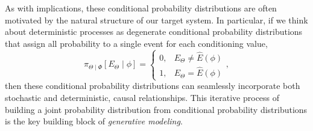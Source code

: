 As with implications, these conditional probability distributions are often 
motivated by the natural structure of our target system.  In particular, if we 
think about deterministic processes as degenerate conditional probability 
distributions that assign all probability to a single event for each conditioning 
value,
%
\begin{equation*}
\pi_{\Theta \mid \Phi} \! \left[ E_{\Theta} \mid \phi \right]
= 
\left\{
\begin{array}{rr}
0, & E_{\Theta} \ne \hat{E} \! \left( \phi \right) \\
1, & E_{\Theta} = \hat{E} \! \left( \phi \right)
\end{array}
\right.,
\end{equation*}
%
then these conditional probability distributions can seamlessly incorporate
both stochastic and deterministic, causal relationships.  This iterative process 
of building a joint probability distribution from conditional probability distributions 
is the key building block of \emph{generative modeling}.
